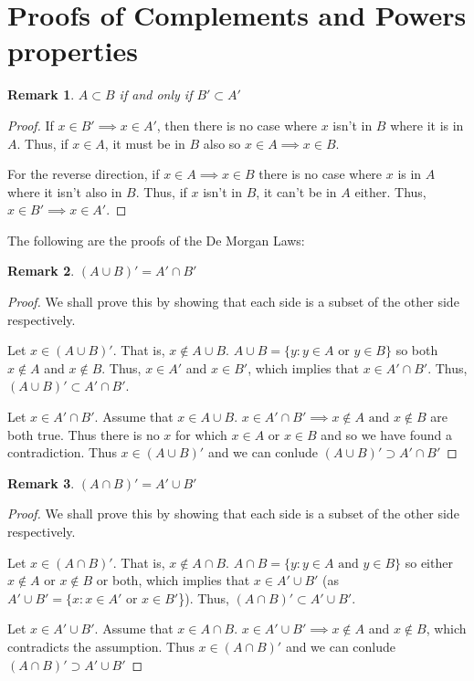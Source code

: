 \documentclass[12pt]{article}
\newtheorem{remark}{Remark}
\begin{document}
\section{Proofs of Complements and Powers properties}\label{Appendix: Complements and Powers proofs}
\begin{remark}
    $A \subset B$ if and only if $B' \subset A'$
\end{remark}
\begin{proof}
    If $x \in B' \implies x \in A'$, then there is no case where $x$ isn't in $B$ where it is in $A$.
    Thus, if $x \in A$, it must be in $B$ also so $x \in A \implies x \in B$.

    For the reverse direction, if $x \in A \implies x \in B$ there is no case where $x$ is in $A$ where it isn't also
    in $B$. Thus, if $x$ isn't in $B$, it can't be in $A$ either. Thus, $x \in B' \implies x \in A'$.
\end{proof}

The following are the proofs of the De Morgan Laws:
\begin{remark}
    $(A \cup B)' = A' \cap B'$
\end{remark}
\begin{proof}
    We shall prove this by showing that each side is a subset of the other side respectively.

    Let $x \in (A \cup B)'$. That is, $x \notin A \cup B$. $A \cup B = \{y: y \in A \text{ or } y \in B\}$
    so both $x \notin A$ and $x \notin B$. Thus, $x \in A'$ and $x \in B'$, which implies that
    $x \in A' \cap B'$. Thus, $(A \cup B)' \subset A' \cap B'$.

    Let $x \in A' \cap B'$. Assume that $x \in A \cup B$. $x \in A' \cap B' \implies x \notin A \text{ and }
    x \notin B$ are both true. Thus there is no $x$ for which $x \in A$ or $x \in B$ and so we have found
    a contradiction. Thus $x \in (A \cup B)'$ and we can conlude $(A \cup B)' \supset A' \cap B'$
\end{proof}

\begin{remark}
    $(A \cap B)' = A' \cup B'$
\end{remark}
\begin{proof}
    We shall prove this by showing that each side is a subset of the other side respectively.

    Let $x \in (A \cap B)'$. That is, $x \notin A \cap B$. $A \cap B = \{y: y \in A \text{ and } y \in B\}$
    so either $x \notin A$ or $x \notin B$ or both, which implies that
    $x \in A' \cup B'$ (as $A' \cup B' = \{x: x \in A' \text{ or } x \in B'$\}). Thus, $(A \cap B)' \subset A' \cup B'$.

    Let $x \in A' \cup B'$. Assume that $x \in A \cap B$. $x \in A' \cup B' \implies x \notin A$ and
    $x \notin B$, which contradicts the assumption. Thus $x \in (A \cap B)'$ and we can conlude $(A \cap B)' \supset A' \cup B'$
\end{proof}
\end{document}
